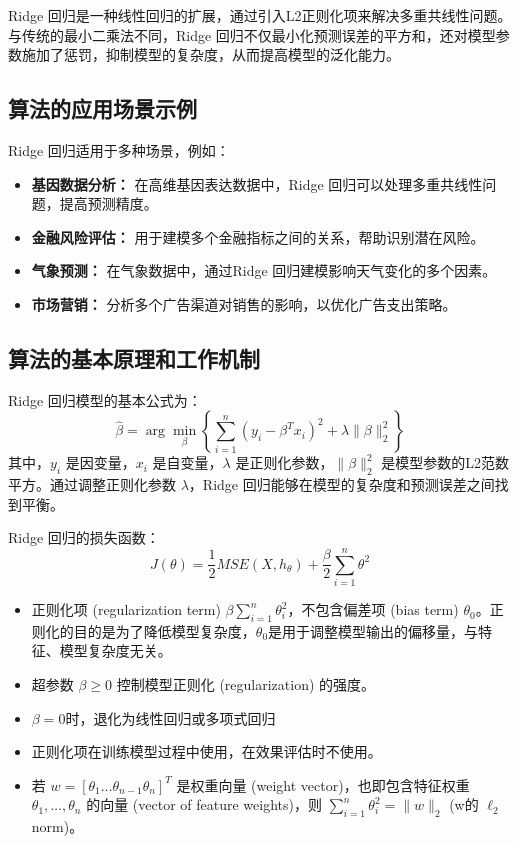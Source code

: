 Ridge 回归是一种线性回归的扩展，通过引入L2正则化项来解决多重共线性问题。与传统的最小二乘法不同，Ridge 回归不仅最小化预测误差的平方和，还对模型参数施加了惩罚，抑制模型的复杂度，从而提高模型的泛化能力。

\subsection*{算法的应用场景示例}
Ridge 回归适用于多种场景，例如：
\begin{itemize}
    \item \textbf{基因数据分析：} 在高维基因表达数据中，Ridge 回归可以处理多重共线性问题，提高预测精度。
    \item \textbf{金融风险评估：} 用于建模多个金融指标之间的关系，帮助识别潜在风险。
    \item \textbf{气象预测：} 在气象数据中，通过Ridge 回归建模影响天气变化的多个因素。
    \item \textbf{市场营销：} 分析多个广告渠道对销售的影响，以优化广告支出策略。
\end{itemize}

\subsection*{算法的基本原理和工作机制}
Ridge 回归模型的基本公式为：
\[
    \hat{\beta} = \arg\min_\beta \left\{ \sum_{i=1}^n (y_i - \beta^T x_i)^2 + \lambda \|\beta\|_2^2 \right\}
\]
其中，\(y_i\) 是因变量，\(x_i\) 是自变量，\(\lambda\) 是正则化参数，\(\|\beta\|_2^2\) 是模型参数的L2范数平方。通过调整正则化参数 \(\lambda\)，Ridge 回归能够在模型的复杂度和预测误差之间找到平衡。

Ridge 回归的损失函数：
\[
    J(\theta)=\frac{1}{2}MSE(X, h_{\theta})+\frac{\beta}{2}\sum_{i=1}^{n}\theta^2
\]
\begin{itemize}
    \item 正则化项 (regularization term) $\beta \sum_{i=1}^n \theta_i^2$，不包含偏差项 (bias term) $\theta_0$。正则化的目的是为了降低模型复杂度，$\theta_0$是用于调整模型输出的偏移量，与特征、模型复杂度无关。
    \item 超参数 $\beta \geq 0$ 控制模型正则化 (regularization) 的强度。
    \item $\beta=0$时，退化为线性回归或多项式回归
    \item 正则化项在训练模型过程中使用，在效果评估时不使用。
    \item 若 $w = [\theta_1 \ldots \theta_{n-1} \theta_n]^T$ 是权重向量 (weight vector)，也即包含特征权重 $\theta_1, \ldots, \theta_n$ 的向量 (vector of feature weights)，则 $\sum_{i=1}^n \theta_i^2 = \|w\|_2$ (w的 $\ell_2$ norm)。
\end{itemize}

